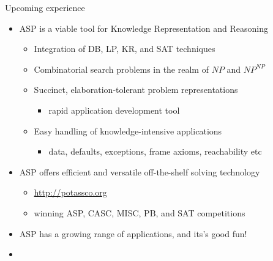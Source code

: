 \begin{frame}{Upcoming experience}
  \begin{itemize}
  \item ASP is a viable tool for Knowledge Representation and Reasoning
    \begin{itemize}
    \item Integration of DB, LP, KR, and SAT techniques
    \item Combinatorial search problems in the realm of $\mathit{NP}$ and $\mathit{NP}^\mathit{NP}$
    \item Succinct, elaboration-tolerant problem representations
      \begin{itemize}\small
      \item rapid application development tool
      \end{itemize}
    \item Easy handling of knowledge-intensive applications
      \begin{itemize}\small
      \item
        data,
        defaults,
        exceptions,
        frame axioms,
        reachability
        etc
      \end{itemize}
    \end{itemize}
  \item ASP offers efficient and versatile off-the-shelf solving technology
    \begin{itemize}
    \item \alert{\url{http://potassco.org}}
    \item winning ASP, CASC, MISC, PB, and SAT competitions
    \end{itemize}
  \item ASP has a growing range of applications, and its's good fun!
    \bigskip
  \item []
    \begin{quote}\qquad
    \end{quote}
  \end{itemize}
\end{frame}
%
